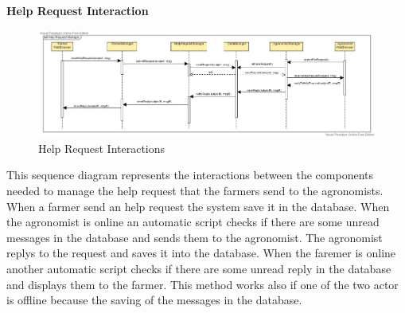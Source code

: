 \documentclass[table, 12pt]{article}
\begin{document}
\newpage
\textbf{Help Request Interaction}
\begin{center}
    \begin{figure}[H]
        \includegraphics[scale=0.45, center]{assets/SequenceDiagram/HelpRequest.jpg}
        \caption{Help Request Interactions}
        \label{fig: helpRequest}
    \end{figure}
\end{center}
This sequence diagram represents the interactions between the components needed to manage the help request that the farmers send to the agronomists.
When a farmer send an help request the system save it in the database.
When the agronomist is online an automatic script checks if there are some unread messages in the database and sends them to the agronomist.
The agronomist replys to the request and saves it into the database. 
When the faremer is online another automatic script checks if there are some unread reply in the database and displays them to the farmer.
This method works also if one of the two actor is offline because the saving of the messages in the database.   
\end{document}

